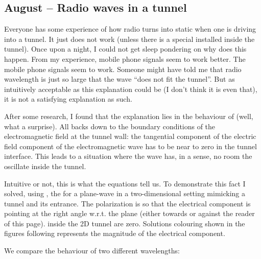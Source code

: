 \documentclass{article}
\begin{document}
\subsection{August – Radio waves in a tunnel}


Everyone has some experience of how radio turns into static when one is driving into a tunnel. It just does not work (unless there is a special   installed inside the tunnel).
Once upon a night, I could not get sleep pondering on why does this happen. From my experience, mobile phone signals seem to work better. The mobile phone signals seem to work. Someone might have told me that  radio wavelength is just so large that the wave “does not fit the tunnel”. But as intuitively acceptable as this explanation could be (I don't think it is even that), it is not a satisfying explanation as such.


After some research, I found that the explanation lies in the behaviour of  (well, what a surprise). All backs down to the boundary conditions of the electromagnetic field at the tunnel wall: the tangential component of the electric field component of the electromagnetic wave has to be near to zero in the tunnel interface. This leads to a situation where the wave has, in a sense, no room the oscillate inside the tunnel.


Intuitive or not, this is what the equations tell us. To demonstrate this fact I solved, using , the  for a plane-wave in a two-dimensional setting mimicking a tunnel and its entrance. The  polarization is so that the electrical component is pointing at the right angle w.r.t. the plane (either towards or against the reader of this page).  inside the 2D tunnel are zero. Solutions colouring shown in the figures following represents the magnitude of the electrical component.

We compare the behaviour of two different wavelengths:
\end{document}
